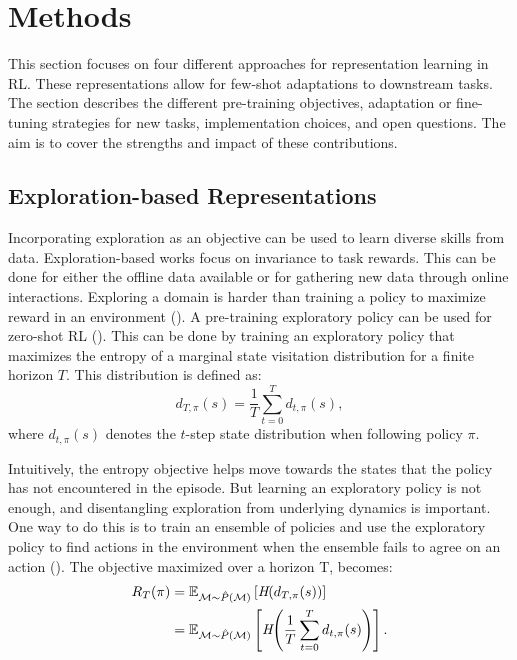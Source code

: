 \documentclass{article}
\begin{document}
\section{Methods}

This section focuses on four different approaches for representation learning in RL. These representations allow for few-shot adaptations to downstream tasks. The section describes the different pre-training objectives, adaptation or fine-tuning strategies for new tasks, implementation choices, and open questions. The aim is to cover the strengths and impact of these contributions.

\subsection{Exploration-based Representations}
Incorporating exploration as an objective can be used to learn diverse skills from data. Exploration-based works focus on invariance to task rewards. This can be done for either the offline data available or for gathering new data through online interactions. 
Exploring a domain is harder than training a policy to maximize reward in an environment (\cite{zisselman2023explore}). A pre-training exploratory policy can be used for zero-shot RL (\cite{zisselman2023explore}). This can be done by training an exploratory policy that maximizes the entropy of a marginal state visitation distribution for a finite horizon $T$. This distribution is defined as:
\begin{equation}
d_{T,\pi}(s) = \frac{1}{T} \sum_{t=0}^{T} d_{t,\pi}(s),
\end{equation}
where $d_{t,\pi}(s)$ denotes the $t$-step state distribution when following policy $\pi$.

Intuitively, the entropy objective helps move towards the states that the policy has not encountered in the episode. But learning an exploratory policy is not enough, and disentangling exploration from underlying dynamics is important. One way to do this is to train an ensemble of policies and use the exploratory policy to find actions in the environment when the ensemble fails to agree on an action (\cite{zisselman2023explore}). The objective maximized over a horizon T, becomes:
\begin{align}
R_T(\pi) 
&= \mathbb{E}_{\mathcal{M} \sim \hat{P}(\mathcal{M})}
  \left[ \emph{H}( d_{T, \pi}(s)) \right] \\
&= \mathbb{E}_{\mathcal{M} \sim \hat{P}(\mathcal{M})}
  \left[
    \emph{H}\!\left( \frac{1}{T} \sum_{t=0}^{T} d_{t,\pi}(s) \right)
  \right].
\end{align}
\end{document}
